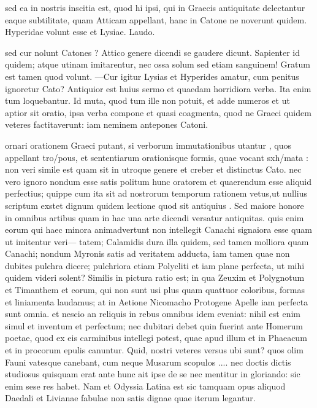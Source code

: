  sed ea in nostris inscitia est, quod hi ipsi, qui in Graecis antiquitate delectantur eaque subtilitate, quam Atticam appellant, hanc in Catone ne noverunt quidem. Hyperidae volunt esse et Lysiae. Laudo.

 sed cur nolunt Catones ? Attico genere dicendi se gaudere dicunt. Sapienter id quidem; atque utinam imitarentur, nec ossa solum sed etiam sanguinem! Gratum est tamen quod volunt. —Cur igitur Lysias et Hyperides amatur, cum penitus ignoretur Cato? Antiquior est huius sermo et quaedam horridiora verba. Ita enim tum loquebantur. Id muta, quod tum ille non potuit, et adde numeros et ut aptior sit oratio, ipsa verba compone et quasi coagmenta, quod ne Graeci quidem veteres factitaverunt: iam neminem antepones Catoni.

 ornari orationem Graeci putant, si verborum immutationibus utantur , quos appellant tro/pous, et sententiarum orationisque formis, quae vocant sxh/mata : non veri simile est quam sit in utroque genere et creber et distinctus Cato. nec vero ignoro nondum esse satis politum hunc oratorem et quaerendum esse aliquid perfectius; quippe cum ita sit ad nostrorum temporum rationem vetus,ut nullius scriptum exstet dignum quidem lectione quod sit antiquius . Sed maiore honore in omnibus artibus quam in hac una arte dicendi versatur antiquitas. quis enim eorum qui haec minora animadvertunt non intellegit Canachi signaiora esse quam ut imitentur veri— tatem; Calamidis dura illa quidem, sed tamen molliora quam Canachi; nondum Myronis satis ad veritatem adducta, iam tamen quae non dubites pulchra dicere; pulchriora etiam Polycliti et iam plane perfecta, ut mihi quidem videri solent? Similis in pictura ratio est; in qua Zeuxim et Polygnotum et Timanthem et eorum, qui non sunt usi plus quam quattuor coloribus, formas et liniamenta laudamus; at in Aetione Nicomacho Protogene Apelle iam perfecta sunt omnia. et nescio an reliquis in rebus omnibus idem eveniat: nihil est enim simul et inventum et perfectum; nec dubitari debet quin fuerint ante Homerum poetae, quod ex eis carminibus intellegi potest, quae apud illum et in Phaeacum et in procorum epulis canuntur. Quid, nostri veteres versus ubi sunt? quos olim Fauni vatesque canebant, cum neque Musarum scopulos .... nec doctis dictis studiosus quisquam erat ante hunc ait ipse de se nec mentitur in gloriando: sic enim sese res habet. Nam et Odyssia Latina est sic tamquam opus aliquod Daedali et Livianae fabulae non satis dignae quae iterum legantur.

